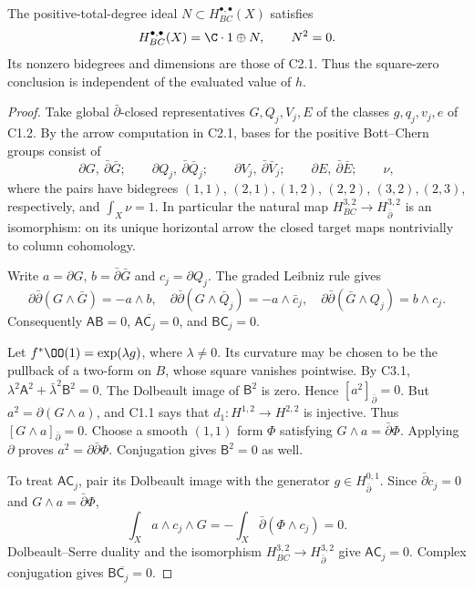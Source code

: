 \begin{proposition}\label{inv:C3.3}
The positive-total-degree ideal $N\subset H^{\bullet,\bullet}_{BC}(X)$
satisfies
\[
H^{\bullet,\bullet}_{BC}(X)=\C\cdot1\oplus N,\qquad N^2=0.
\]
Its nonzero bidegrees and dimensions are those of C2.1.  Thus the
square-zero conclusion is independent of the evaluated value of $h$.
\end{proposition}
\begin{proof}
Take global $\bar\partial$-closed representatives $G,Q_j,V_j,E$
of the classes $g,q_j,v_j,e$ of C1.2.  By the arrow computation in
C2.1, bases for the positive Bott--Chern groups consist of
\[
\partial G,\ \bar\partial\bar G;\qquad
\partial Q_j,\ \bar\partial\bar Q_j;\qquad
\partial V_j,\ \bar\partial\bar V_j;\qquad
\partial E,\ \bar\partial\bar E;\qquad \nu,
\]
where the pairs have bidegrees $(1,1)$, $(2,1),(1,2)$,
$(2,2)$, $(3,2),(2,3)$, respectively, and
$\int_X\nu=1$.  In particular the natural map
$H^{3,2}_{BC}\to H^{3,2}_{\bar\partial}$ is an isomorphism:
on its unique horizontal arrow the closed target maps nontrivially
to column cohomology.

Write $a=\partial G$, $b=\bar\partial\bar G$ and
$c_j=\partial Q_j$.  The graded Leibniz rule gives
\[
\partial\bar\partial(G\wedge\bar G)=-a\wedge b,
\quad
\partial\bar\partial(G\wedge\bar Q_j)
=-a\wedge\bar c_j,
\quad
\partial\bar\partial(\bar G\wedge Q_j)=b\wedge c_j.
\]
Consequently $\mathsf A\mathsf B=0$,
$\mathsf A\overline{\mathsf C_j}=0$, and
$\mathsf B\mathsf C_j=0$.

Let $f^*\OO(1)=\exp(\lambda g)$, where $\lambda\ne0$.
Its curvature may be chosen to be the pullback of a two-form on $B$,
whose square vanishes pointwise.  By C3.1,
$\lambda^2\mathsf A^2+\bar\lambda^2\mathsf B^2=0$.
The Dolbeault image of $\mathsf B^2$ is zero.  Hence
$[a^2]_{\bar\partial}=0$.  But
$a^2=\partial(G\wedge a)$, and C1.1 says that
$d_1:H^{1,2}\to H^{2,2}$ is injective.  Thus
$[G\wedge a]_{\bar\partial}=0$.  Choose a smooth $(1,1)$ form
$\Phi$ satisfying $G\wedge a=\bar\partial\Phi$.  Applying
$\partial$ proves $a^2=\partial\bar\partial\Phi$.
Conjugation gives $\mathsf B^2=0$ as well.

To treat $\mathsf A\mathsf C_j$, pair its Dolbeault image with the
generator $g\in H^{0,1}_{\bar\partial}$.  Since
$\bar\partial c_j=0$ and $G\wedge a=\bar\partial\Phi$,
\[
\int_X a\wedge c_j\wedge G
=-\int_X\bar\partial(\Phi\wedge c_j)=0.
\]
Dolbeault--Serre duality and the isomorphism
$H^{3,2}_{BC}\to H^{3,2}_{\bar\partial}$ give
$\mathsf A\mathsf C_j=0$.  Complex conjugation gives
$\mathsf B\overline{\mathsf C_j}=0$.


\end{proof}
